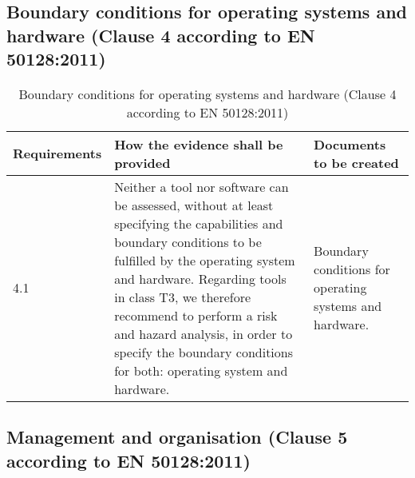 \documentclass{template/openetcs_report}
\begin{document}
\subsection{Boundary conditions for operating systems and hardware (Clause 4 according to EN 50128:2011)}
{\footnotesize\sffamily\centering
\begin{longtable}{|p{2cm}|p{9cm}|p{3cm}|}
\caption{Boundary conditions for operating systems and hardware (Clause 4 according to EN 50128:2011)}\\
\hline
\bfseries Requirements & \bfseries How the evidence shall be provided & \bfseries Documents to be created\\
\hline
\hline
\endhead
\hline
\endfoot

4.1 & Neither a tool nor software can be assessed, without at least specifying the capabilities and boundary conditions to be fulfilled by the operating system and hardware. 
\linebreak
\linebreak
Regarding tools in class T3, we therefore recommend to perform a risk and hazard analysis, in order to specify the boundary conditions for both: operating system and hardware.
& Boundary conditions for operating systems and hardware.\\ 
\hline
\end{longtable}}


\subsection{Management and organisation (Clause 5 according to EN 50128:2011)}
\label{clause5}
\end{document}
